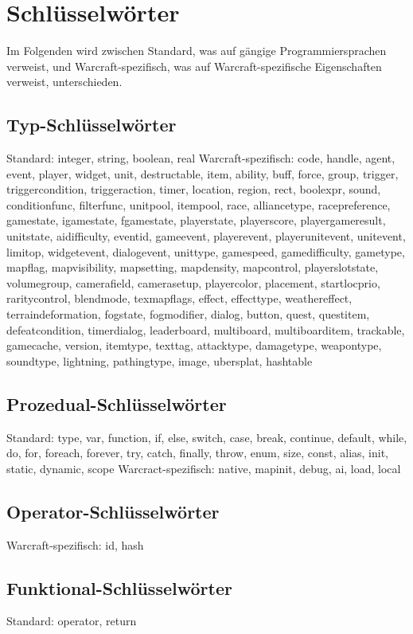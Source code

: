 \chapter{Schlüsselwörter}

Im Folgenden wird zwischen Standard, was auf gängige Programmiersprachen verweist, und Warcraft-spezifisch, was auf Warcraft-spezifische
Eigenschaften verweist, unterschieden.

\section{Typ-Schlüsselwörter}
Standard: integer, string, boolean, real
Warcraft-spezifisch: code, handle, agent, event, player, widget, unit, destructable, item, ability, buff, force, group, trigger, triggercondition, triggeraction, timer, location, region, rect, boolexpr, sound, conditionfunc, filterfunc, unitpool, itempool, race, alliancetype, racepreference, gamestate, igamestate, fgamestate, playerstate, playerscore, playergameresult, unitstate, aidifficulty, eventid, gameevent, playerevent, playerunitevent, unitevent, limitop, widgetevent, dialogevent, unittype, gamespeed, gamedifficulty, gametype, mapflag, mapvisibility, mapsetting, mapdensity, mapcontrol, playerslotstate, volumegroup, camerafield, camerasetup, playercolor, placement, startlocprio, raritycontrol, blendmode, texmapflags, effect, effecttype, weathereffect, terraindeformation, fogstate, fogmodifier, dialog, button, quest, questitem, defeatcondition, timerdialog, leaderboard, multiboard, multiboarditem, trackable, gamecache, version, itemtype, texttag, attacktype, damagetype, weapontype, soundtype, lightning, pathingtype, image, ubersplat, hashtable

\section{Prozedual-Schlüsselwörter}
Standard: type, var, function, if, else, switch, case, break, continue, default, while, do, for, foreach, forever, try, catch, finally, throw, enum, size, const, alias, init, static, dynamic, scope
Warcract-spezifisch: native, mapinit, debug, ai, load, local

\section{Operator-Schlüsselwörter}
Warcraft-spezifisch: id, hash

\section{Funktional-Schlüsselwörter}
Standard: operator, return

